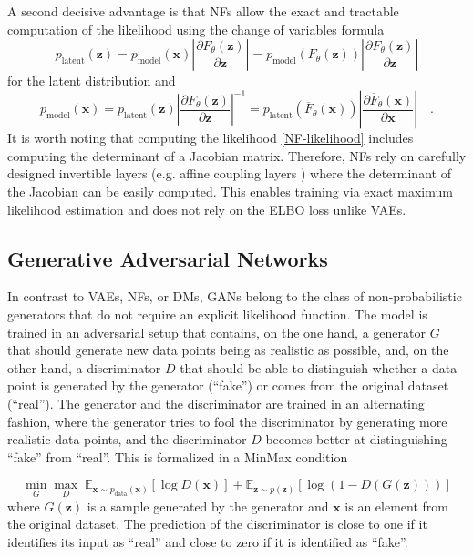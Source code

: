 A second decisive advantage is that \gls{NF}s allow the exact and tractable computation of the likelihood using the change of variables formula \cite{pawlowski2024physics}
\begin{equation}
    p_{\text{latent}}(\textbf{z}) = p_\text{model}(\textbf{x}) \left| \frac{\partial F_\theta(\textbf{z})}{\partial \textbf{z}}\right| =  p_\text{model}(F_\theta(\textbf{z})) \left| \frac{\partial F_\theta(\textbf{z})}{\partial \textbf{z}} \right|
\end{equation}
for the latent distribution and 
\begin{equation}
    p_{\text{model}}(\textbf{x}) = p_{\text{latent}}(\textbf{z}) \left| \frac{\partial F_\theta(\textbf{z})}{\partial \textbf{z}} \right|^{-1} =
    p_{\text{latent}}(\overline{F}_\theta(\textbf{x})) \left| \frac{\partial \overline{F}_\theta(\textbf{x})}{\partial \textbf{x}} \right|
    \label{NF-likelihood} \quad.
\end{equation}
It is worth noting that computing the likelihood \eqref{NF-likelihood} includes computing the determinant of a Jacobian matrix. Therefore, \gls{NF}s rely on carefully designed invertible layers (e.g. affine coupling layers \cite{AffineCouplingLayer}) where the determinant of the Jacobian can be easily computed. This enables training via exact maximum likelihood estimation and does not rely on the \gls{ELBO} loss unlike \gls{VAE}s.

\subsection{Generative Adversarial Networks}
In contrast to \gls{VAE}s, \gls{NF}s, or \gls{DM}s, \gls{GAN}s \cite{GAN} belong to the class of non-probabilistic generators that do not require an explicit likelihood function. The model is trained in an adversarial setup that contains, on the one hand, a generator $G$ that should generate new data points being as realistic as possible, and, on the other hand, a discriminator $D$ that should be able to distinguish whether a data point is generated by the generator (``fake'') or comes from the original dataset (``real''). The generator and the discriminator are trained in an alternating fashion, where the generator tries to fool the discriminator by generating more realistic data points, and the discriminator $D$ becomes better at distinguishing ``fake'' from ``real''. This is formalized in a MinMax condition

\begin{equation}
\min_G \max_D \; \mathbb{E}_{\textbf{x} \sim p_{\text{data}}(\textbf{x})}[\log D(\textbf{x})] + \mathbb{E}_{\textbf{z} \sim p(\textbf{z})}[\log(1 - D(G(\textbf{z})))]
\end{equation}
where $G(\textbf{z})$ is a sample generated by the generator and $\textbf{x}$ is an element from the original dataset. The prediction of the discriminator is close to one if it identifies its input as ``real'' and close to zero if it is identified as ``fake''. 

